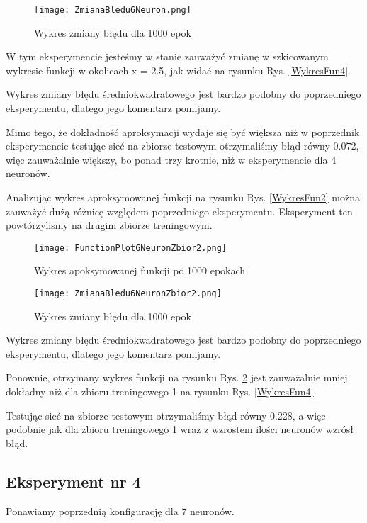 \documentclass[12pt]{article}
\begin{document}
\begin{figure}[!htb]
 \centering
 \texttt{[image: ZmianaBledu6Neuron.png]}
 \vspace{-0.3cm}
 \caption{Wykres zmiany błędu dla 1000 epok}
 \label{WykresBlad4}
\end{figure}

\newpage
W tym eksperymencie jesteśmy w stanie zauważyć zmianę w szkicowanym wykresie funkcji w okolicach x = 2.5, jak widać na rysunku Rys. \ref{WykresFun4}.

Wykres zmiany błędu średniokwadratowego jest bardzo podobny do poprzedniego eksperymentu, dlatego jego komentarz pomijamy.

Mimo tego, że dokładność aproksymacji wydaje się być większa niż w poprzednik eksperymencie testując sieć na zbiorze testowym otrzymaliśmy błąd równy 0.072, więc zauważalnie większy, bo ponad trzy krotnie, niż w eksperymencie dla 4 neuronów. 

Analizując wykres aproksymowanej funkcji na rysunku Rys. \ref{WykresFun2} można zauważyć dużą różnicę względem poprzedniego eksperymentu.
\newpage
Eksperyment ten powtórzylismy na drugim zbiorze treningowym. 

\begin{figure}[!htb]
 \centering
 \texttt{[image: FunctionPlot6NeuronZbior2.png]}
 \caption{Wykres apoksymowanej funkcji po 1000 epokach}
 \vspace{-0.3cm}
 \label{WykresFun5}
\end{figure}



\begin{figure}[!htb]
 \centering
 \texttt{[image: ZmianaBledu6NeuronZbior2.png]}
 \vspace{-0.3cm}
 \caption{Wykres zmiany błędu dla 1000 epok}
 \label{WykresBlad5}
\end{figure}

\newpage
Wykres zmiany błędu średniokwadratowego jest bardzo podobny do poprzedniego eksperymentu, dlatego jego komentarz pomijamy.

Ponownie, otrzymany wykres funkcji na rysunku Rys. \ref{WykresFun5} jest zauważalnie mniej dokładny niż dla zbioru treningowego 1 na rysunku Rys. \ref{WykresFun4}.

Testując sieć na zbiorze testowym otrzymaliśmy błąd równy 0.228, a więc podobnie jak dla zbioru treningowego 1 wraz z wzrostem ilości neuronów wzrósł błąd.
\newpage

\subsection{Eksperyment nr 4}
Ponawiamy poprzednią konfigurację dla 7 neuronów.
\end{document}
